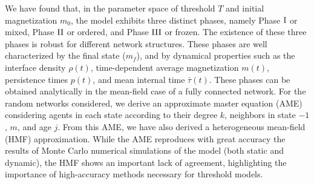 We have found that, in the parameter space of threshold $T$ and initial magnetization $m_0$, the model exhibits three distinct phases, namely Phase ${\rm I}$ or mixed, Phase ${\rm II}$ or ordered, and Phase ${\rm III}$ or frozen. The existence of these three phases is robust for different network structures.
These phases are well characterized by the final state ($m_f$), and by dynamical properties such as the interface density $\rho(t)$, time-dependent average magnetization $m(t)$, persistence times $p(t)$, and mean internal time $\bar{\tau}(t)$. These phases can be obtained analytically in the mean-field case of a fully connected network. For the random networks considered, we derive an approximate master equation (AME) \cite{gleeson-2013,Abella-2022-AME} considering agents in each state according to their degree $k$,  neighbors in state $-1$, $m$, and age $j$. From this AME, we have also derived a heterogeneous mean-field (HMF) approximation. While the AME reproduces with great accuracy the results of Monte Carlo numerical simulations of the model (both static and dynamic), the HMF shows an important lack of agreement, highlighting the importance of high-accuracy methods necessary for threshold models. 


